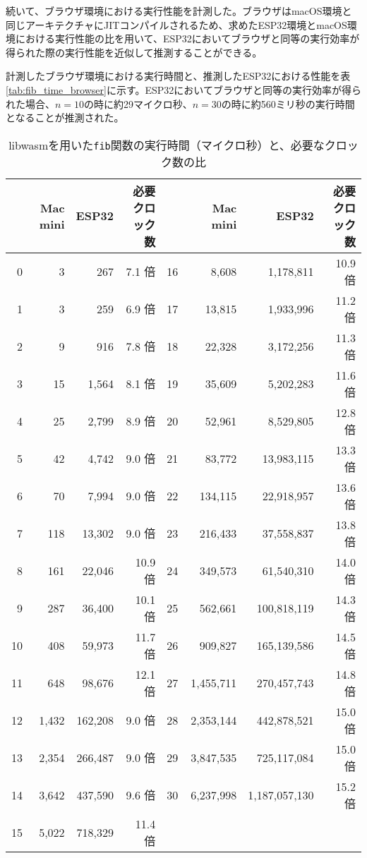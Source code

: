 続いて、ブラウザ環境における実行性能を計測した。ブラウザはmacOS環境と同じアーキテクチャにJITコンパイルされるため、求めたESP32環境とmacOS環境における実行性能の比を用いて、ESP32においてブラウザと同等の実行効率が得られた際の実行性能を近似して推測することができる。

計測したブラウザ環境における実行時間と、推測したESP32における性能を表\ref{tab:fib_time_browser}に示す。ESP32においてブラウザと同等の実行効率が得られた場合、$n=10$の時に約29マイクロ秒、$n=30$の時に約560ミリ秒の実行時間となることが推測された。

\begin{table}[htbp]
  \caption{libwasmを用いた{\tt fib}関数の実行時間（マイクロ秒）と、必要なクロック数の比}
  \label{tab:fib_time}
  \begin{center}
    \begin{tabular}{|r|r|r||r||r|r|r||r|}
\hline
& Mac mini & ESP32 & 必要クロック数 & & Mac mini & ESP32 & 必要クロック数 \\ \hline
0  &     3 &     267 &  7.1 倍 & 16 &     8,608 &     1,178,811 & 10.9 倍 \\ \hline
1  &     3 &     259 &  6.9 倍 & 17 &    13,815 &     1,933,996 & 11.2 倍 \\ \hline
2  &     9 &     916 &  7.8 倍 & 18 &    22,328 &     3,172,256 & 11.3 倍 \\ \hline
3  &    15 &   1,564 &  8.1 倍 & 19 &    35,609 &     5,202,283 & 11.6 倍 \\ \hline
4  &    25 &   2,799 &  8.9 倍 & 20 &    52,961 &     8,529,805 & 12.8 倍 \\ \hline
5  &    42 &   4,742 &  9.0 倍 & 21 &    83,772 &    13,983,115 & 13.3 倍 \\ \hline
6  &    70 &   7,994 &  9.0 倍 & 22 &   134,115 &    22,918,957 & 13.6 倍 \\ \hline
7  &   118 &  13,302 &  9.0 倍 & 23 &   216,433 &    37,558,837 & 13.8 倍 \\ \hline
8  &   161 &  22,046 & 10.9 倍 & 24 &   349,573 &    61,540,310 & 14.0 倍 \\ \hline
9  &   287 &  36,400 & 10.1 倍 & 25 &   562,661 &   100,818,119 & 14.3 倍 \\ \hline
10 &   408 &  59,973 & 11.7 倍 & 26 &   909,827 &   165,139,586 & 14.5 倍 \\ \hline
11 &   648 &  98,676 & 12.1 倍 & 27 & 1,455,711 &   270,457,743 & 14.8 倍 \\ \hline
12 & 1,432 & 162,208 &  9.0 倍 & 28 & 2,353,144 &   442,878,521 & 15.0 倍 \\ \hline
13 & 2,354 & 266,487 &  9.0 倍 & 29 & 3,847,535 &   725,117,084 & 15.0 倍 \\ \hline
14 & 3,642 & 437,590 &  9.6 倍 & 30 & 6,237,998 & 1,187,057,130 & 15.2 倍 \\ \hline
15 & 5,022 & 718,329 & 11.4 倍 & & & & \\ \hline
    \end{tabular}
  \end{center}
\end{table}

